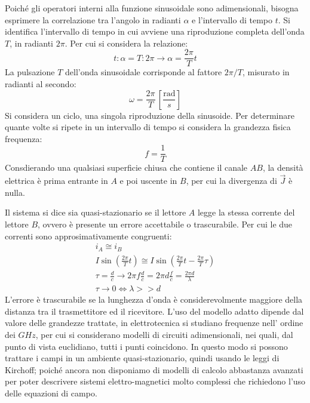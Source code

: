 \documentclass{article}
\numberwithin{equation}{subsection}
\begin{document}
Poiché gli operatori interni alla funzione sinusoidale sono adimensionali, bisogna esprimere la correlazione tra l'angolo in radianti $\alpha$ e l'intervallo di tempo $t$. 
Si identifica l'intervallo di tempo in cui avviene una riproduzione completa dell'onda $T$, in radianti $2\pi$. Per cui si considera la relazione:
\begin{equation*}
    t:\alpha=T:2\pi\to\displaystyle\alpha=\frac{2\pi}{T}t
\end{equation*}
La pulsazione $T$ dell'onda sinusoidale corrisponde al fattore ${2\pi}/T$, misurato in radianti al secondo:
\begin{equation*}
    \omega=\displaystyle\frac{2\pi}{T}\,\left[\frac{\mbox{rad}}{s}\right]
\end{equation*}
Si considera un ciclo, una singola riproduzione della sinusoide. Per determinare quante volte si ripete in un intervallo di tempo si considera la grandezza fisica frequenza:
\begin{equation*}
    f=\displaystyle\frac{1}{T}
\end{equation*}
Consdierando una qualsiasi superficie chiusa che contiene il canale $AB$, la densità elettrica è prima entrante in $A$ e poi uscente in $B$, per cui la divergenza di $\vec J$ 
è nulla.


Il sistema si dice sia quasi-stazionario se il lettore $A$ legge la stessa corrente del lettore $B$, ovvero è presente un errore accettabile o trascurabile. 
Per cui le due correnti sono approsimativamente congruenti:
\begin{gather*}
    i_A\cong i_B\\
    I\sin\displaystyle\left(\frac{2\pi}{T}t\right)\cong I\sin\left(\frac{2\pi}{T}t-\frac{2\pi}{T}\tau\right)\\
    \tau=\displaystyle\frac{d}{c}\to \displaystyle 2\pi f\frac{d}{c}=2\pi d\frac{f}{c}=\frac{2\pi d}{\lambda}\\
    \tau\to 0\iff \lambda>>d
\end{gather*}
L'errore è trascurabile se la lunghezza d'onda è considerevolmente maggiore della distanza tra il trasmettitore ed il ricevitore. 
L'uso del modello adatto dipende dal valore delle grandezze trattate, in elettrotecnica si studiano frequenze nell'
ordine dei $GHz$, per cui si considerano modelli di circuiti adimensionali, nei quali, dal punto di vista euclidiano, tutti i punti coincidono. In questo modo si possono 
trattare i campi in un ambiente quasi-stazionario, quindi usando le leggi di Kirchoff; poiché ancora non disponiamo di modelli di calcolo abbastanza avanzati per poter 
descrivere sistemi elettro-magnetici molto complessi che richiedono l'uso delle equazioni di campo. 
\end{document}
